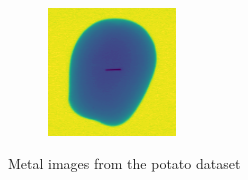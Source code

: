 \documentclass[11pt]{article}
\begin{document}
\begin{figure}[!h]
\begin{subfigure}[b]{0.22\textwidth}
         \caption{}
         \label{fig:metal_47}
     \end{subfigure}
     \\
    \begin{subfigure}[b]{0.22\textwidth}
         \centering
         \includegraphics[width=\textwidth]{figurer/potato_dataset/metal/metal_48.jpg}
         \caption{}
         \label{fig:metal_48}
     \end{subfigure}
    \caption{Metal images from the potato dataset}
\end{figure}
\end{document}
